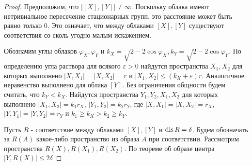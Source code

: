 \begin{proof}
  Предположим, что $ \big|[X],[Y]\big| \neq \infty $. Поскольку облака имеют нетривиальное пересечение стационарных групп, это расстояние может быть равно только $0$. Это означает, что между облаками $ [X], [Y] $ существуют соответствия со сколь угодно малым искажением.

  Обозначим углы облаков $ \varphi_X, \varphi_Y $ и $ k_X = \sqrt{2-2\cos \varphi_X},  k_Y = \sqrt{2-2\cos \varphi_Y} $. По определению угла раствора для всякого $ \varepsilon > 0 $ найдутся пространства $ X_1,X_2 $ для которых выполнено $ |X,X_1|=|X,X_2| = r $ и  $ |X_1,X_2|\le (k_X + \varepsilon) r $. Аналогичное неравенство выполнено для облака $[Y]$. Без ограничения общности будем считать, что $ k_Y < k_X $. Найдутся пространства $Y_1, Y_2, X_1, X_2$ для которых выполнено $|X_1,X_2| = k_1 r_X$, $|Y_1,Y_2| = k_2 r_Y$, где $ |X,X_1|=|X,X_2| = r_X $, $ |Y,Y_1|=|Y,Y_2| = r_Y $ и $k_1 \ge k_X > k_2 \ge k_Y $. 

  Пусть $ R $ - соответствие между облаками $ [X], [Y] $ и $ \operatorname{dis} R = \delta$. Будем обозначать за $ R(A) $ какое-либо пространство из образа $A$ при соответствии. Рассмотрим пространства $ R(X), R(X_1), R(X_2) $. По теореме об образе центра $ \big|Y,R(X)\big| \le 2\delta$
\end{proof}

  

